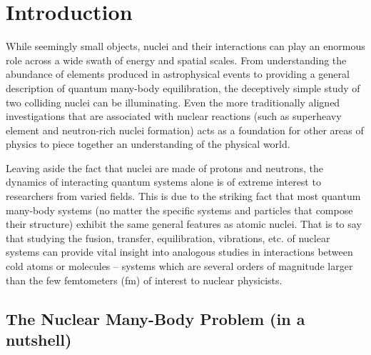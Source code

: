 
\chapter{Introduction}\label{chapters:Introduction}
\vspace{-7mm}

While seemingly small objects, nuclei and their interactions can play an enormous role across a wide swath of energy and spatial scales.
From understanding the abundance of elements produced in astrophysical events to providing a general description of quantum many-body equilibration, the deceptively simple study of two colliding nuclei can be illuminating.
Even the more traditionally aligned investigations that are associated with nuclear reactions (such as superheavy element and neutron-rich nuclei formation) acts as a foundation for other areas of physics to piece together an understanding of the physical world.

Leaving aside the fact that nuclei are made of protons and neutrons, the dynamics of interacting quantum systems alone is of extreme interest to researchers from varied fields.
This is due to the striking fact that most quantum many-body systems (no matter the specific systems and particles that compose their structure) exhibit the same general features as atomic nuclei.
That is to say that studying the fusion, transfer, equilibration, vibrations, etc. of nuclear systems can provide vital insight into analogous studies in interactions between cold atoms or molecules -- systems which are several orders of magnitude larger than the few femtometers (fm) of interest to nuclear physicists.

\section*{The Nuclear Many-Body Problem (in a nutshell)}

